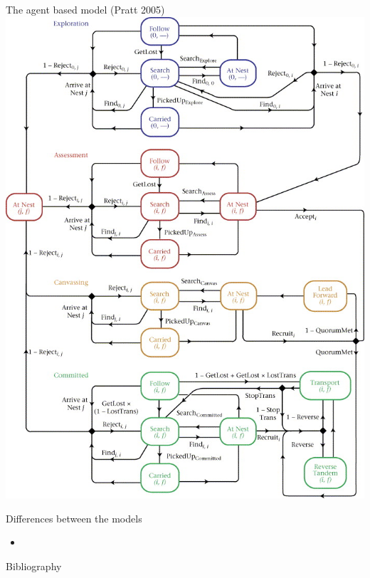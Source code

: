 \documentclass{beamer}
\begin{document}
  \begin{frame}{The agent based model (Pratt 2005)}
      \includegraphics[scale=1.6]{agent}
  \end{frame}

  \begin{frame}{Differences between the models}
      \begin{itemize}
          \item 
      \end{itemize}
  \end{frame}

  \begin{frame}{Bibliography}
      
  \end{frame}
\end{document}
